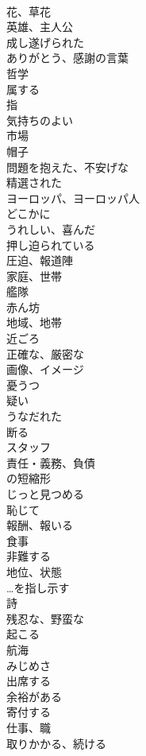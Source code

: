 \documentclass[8pt]{extreport}
\begin{document}
\begin{CJK}{UTF8}{min}
\\	花、草花	
\\	英雄、主人公	
\\	成し遂げられた	
\\	ありがとう、感謝の言葉	
\\	哲学	
\\	属する	
\\	指	
\\	気持ちのよい	
\\	市場	
\\	帽子	
\\	問題を抱えた、不安げな	
\\	精選された	
\\	ヨーロッパ、ヨーロッパ人	
\\	どこかに	
\\	うれしい、喜んだ	
\\	押し迫られている	
\\	圧迫、報道陣	
\\	家庭、世帯	
\\	艦隊	
\\	赤ん坊	
\\	地域、地帯	
\\	近ごろ	
\\	正確な、厳密な	
\\	画像、イメージ	
\\	憂うつ	
\\	疑い	
\\	うなだれた	
\\	断る	
\\	スタッフ	
\\	責任・義務、負債	
\\	の短縮形	
\\	じっと見つめる	
\\	恥じて	
\\	報酬、報いる	
\\	食事	
\\	非難する	
\\	地位、状態	
\\	…を指し示す	
\\	詩	
\\	残忍な、野蛮な	
\\	起こる	
\\	航海	
\\	みじめさ	
\\	出席する	
\\	余裕がある	
\\	寄付する	
\\	仕事、職	
\\	取りかかる、続ける	

\end{CJK}
\end{document}
